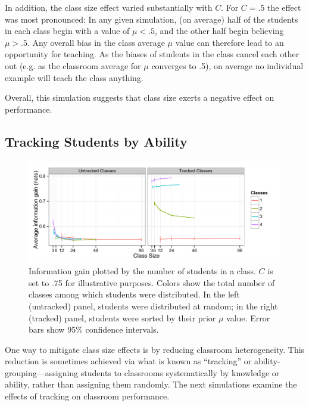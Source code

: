 \documentclass[10pt,letterpaper]{article}
\begin{document}
In addition, the class size effect varied substantially with $C$. For $C=.5$ the effect was most pronounced: In any given simulation, (on average) half of the students in each class begin with a value of $\mu < .5$, and the other half begin believing $\mu > .5$. Any overall bias in the class average $\mu$ value can therefore lead to an opportunity for teaching. As the biases of students in the class cancel each other out (e.g. as the classroom average for $\mu$ converges to .5), on average no individual example will teach the class anything. 

Overall, this simulation suggests that class size exerts a negative effect on performance. 

\subsection{Tracking Students by Ability}

\begin{figure}
\begin{center}
\includegraphics[width=5.5in]{figures/tracking.pdf}
\end{center}
\caption{\label{fig:tracking} Information gain plotted by the number of students in a class. $C$ is set to .75 for illustrative purposes. Colors show the total number of classes among which students were distributed. In the left (untracked) panel, students were distributed at random; in the right (tracked) panel, students were sorted by their prior $\mu$ value. Error bars show 95\% confidence intervals.}
\end{figure}

One way to mitigate class size effects is by reducing classroom heterogeneity. This reduction is sometimes achieved via what is known as ``tracking'' or ability-grouping---assigning students to classrooms systematically by knowledge or ability, rather than assigning them randomly. The next simulations examine the effects of tracking on classroom performance. 
\end{document}
